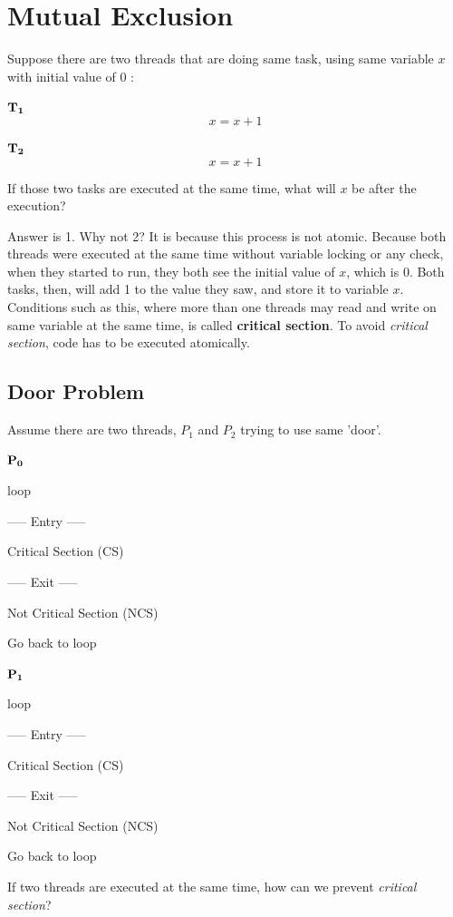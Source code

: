 \documentclass[twoside]{article}
\begin{document}
\section{Mutual Exclusion}
Suppose there are two threads that are doing same task, using same variable $x$ with initial value of 0 :

\noindent\begin{minipage}[t]{0.5\linewidth}
    \centering
    ${\bf T_1}$
    \[x = x + 1\]
    \end{minipage}%
    \begin{minipage}[t]{0.5\linewidth}
    \centering
    ${\bf T_2}$
    \[x = x + 1\]
\end{minipage}\par\bigskip
If those two tasks are executed at the same time, what will $x$ be after the execution?

Answer is 1. Why not 2? It is because this process is not atomic.
Because both threads were executed at the same time without variable locking or any check, when they started to run, they both see the initial value of $x$, which is 0.
Both tasks, then, will add 1 to the value they saw, and store it to variable $x$.
Conditions such as this, where more than one threads may read and write on same variable at the same time, is called {\bf critical section}. To avoid {\it critical section}, code has to be executed atomically.

\subsection{Door Problem}
Assume there are two threads, $P_1$ and $P_2$ trying to use same 'door'.

\noindent\begin{minipage}[t]{0.5\linewidth}
    \centering
    ${\bf P_0}$
    
    loop
    
    ----- Entry -----
    
    Critical Section (CS)
    
    ----- Exit -----
    
    Not Critical Section (NCS)
    
    Go back to loop
    \end{minipage}%
    \begin{minipage}[t]{0.5\linewidth}
    \centering
    ${\bf P_1}$
    
    loop
    
    ----- Entry -----
    
    Critical Section (CS)
    
    ----- Exit -----
    
    Not Critical Section (NCS)
    
    Go back to loop
\end{minipage}\par\bigskip
If two threads are executed at the same time, how can we prevent {\it critical section}?
\end{document}
